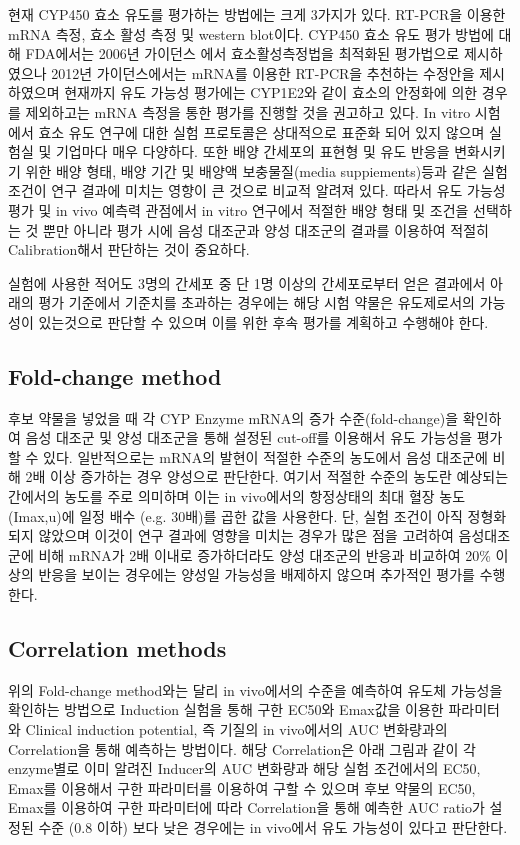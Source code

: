 \documentclass[
  11pt,
  krantz2, a4paper, twoside]{krantz}
\begin{document}
현재 CYP450 효소 유도를 평가하는 방법에는 크게 3가지가 있다. RT-PCR을
이용한 mRNA 측정, 효소 활성 측정 및 western blot이다. CYP450 효소 유도
평가 방법에 대해 FDA에서는 2006년 가이던스 에서 효소활성측정법을
최적화된 평가법으로 제시하였으나 2012년 가이던스에서는 mRNA를 이용한
RT-PCR을 추천하는 수정안을 제시하였으며 현재까지 유도 가능성 평가에는
CYP1E2와 같이 효소의 안정화에 의한 경우를 제외하고는 mRNA 측정을 통한
평가를 진행할 것을 권고하고 있다. In vitro 시험에서 효소 유도 연구에
대한 실험 프로토콜은 상대적으로 표준화 되어 있지 않으며 실험실 및
기업마다 매우 다양하다. 또한 배양 간세포의 표현형 및 유도 반응을
변화시키기 위한 배양 형태, 배양 기간 및 배양액 보충물질(media
suppiements)등과 같은 실험 조건이 연구 결과에 미치는 영향이 큰 것으로
비교적 알려져 있다. 따라서 유도 가능성 평가 및 in vivo 예측력 관점에서
in vitro 연구에서 적절한 배양 형태 및 조건을 선택하는 것 뿐만 아니라
평가 시에 음성 대조군과 양성 대조군의 결과를 이용하여 적절히
Calibration해서 판단하는 것이 중요하다.

실험에 사용한 적어도 3명의 간세포 중 단 1명 이상의 간세포로부터 얻은
결과에서 아래의 평가 기준에서 기준치를 초과하는 경우에는 해당 시험
약물은 유도제로서의 가능성이 있는것으로 판단할 수 있으며 이를 위한 후속
평가를 계획하고 수행해야 한다.

\subsection{Fold-change method}\label{fold-change-method}

후보 약물을 넣었을 때 각 CYP Enzyme mRNA의 증가 수준(fold-change)을
확인하여 음성 대조군 및 양성 대조군을 통해 설정된 cut-off를 이용해서
유도 가능성을 평가할 수 있다. 일반적으로는 mRNA의 발현이 적절한 수준의
농도에서 음성 대조군에 비해 2배 이상 증가하는 경우 양성으로 판단한다.
여기서 적절한 수준의 농도란 예상되는 간에서의 농도를 주로 의미하며 이는
in vivo에서의 항정상태의 최대 혈장 농도(Imax,u)에 일정 배수 (e.g.
30배)를 곱한 값을 사용한다. 단, 실험 조건이 아직 정형화 되지 않았으며
이것이 연구 결과에 영향을 미치는 경우가 많은 점을 고려하여 음성대조군에
비해 mRNA가 2배 이내로 증가하더라도 양성 대조군의 반응과 비교하여 20\%
이상의 반응을 보이는 경우에는 양성일 가능성을 배제하지 않으며 추가적인
평가를 수행한다.

\subsection{Correlation methods}\label{correlation-methods}

위의 Fold-change method와는 달리 in vivo에서의 수준을 예측하여 유도체
가능성을 확인하는 방법으로 Induction 실험을 통해 구한 EC50와 Emax값을
이용한 파라미터와 Clinical induction potential, 즉 기질의 in vivo에서의
AUC 변화량과의 Correlation을 통해 예측하는 방법이다. 해당 Correlation은
아래 그림과 같이 각 enzyme별로 이미 알려진 Inducer의 AUC 변화량과 해당
실험 조건에서의 EC50, Emax를 이용해서 구한 파라미터를 이용하여 구할 수
있으며 후보 약물의 EC50, Emax를 이용하여 구한 파라미터에 따라
Correlation을 통해 예측한 AUC ratio가 설정된 수준 (0.8 이하) 보다 낮은
경우에는 in vivo에서 유도 가능성이 있다고 판단한다.
\end{document}

